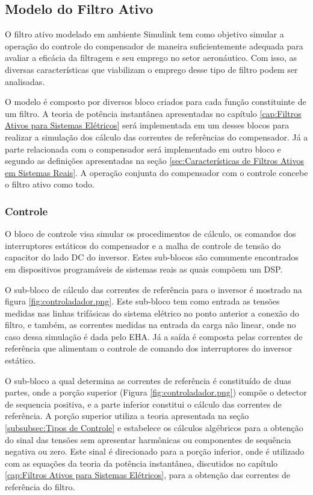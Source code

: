 
\subsection{Modelo do Filtro Ativo}

O filtro ativo modelado em ambiente Simulink tem como objetivo simular a operação do controle do compensador de maneira suficientemente adequada para avaliar a eficácia da filtragem e seu emprego no setor aeronáutico. Com isso, as diversas características que viabilizam o emprego desse tipo de filtro podem ser analisadas.

O modelo é composto por diversos bloco criados para cada função constituinte de um filtro. A teoria de potência instantânea apresentadas no capítulo \ref{cap:Filtros Ativos para Sistemas Elétricos} será implementada em um desses blocos para realizar a simulação dos cálculo das correntes de referências do compensador. Já a parte relacionada com o compensador será implementado em outro bloco e segundo as definições apresentadas na seção \ref{sec:Características de Filtros Ativos em Sistemas Reais}. A operação conjunta do compensador com o controle concebe o filtro ativo como todo.

\subsubsection{Controle}

O bloco de controle visa simular os procedimentos de cálculo, os comandos dos interruptores estáticos do compensador e a malha de controle de tensão do capacitor do lado DC do inversor. Estes sub-blocos são comumente encontrados em dispositivos programáveis de sistemas reais as quais compõem um DSP.

O sub-bloco de cálculo das correntes de referência para o inversor é mostrado na figura \ref{fig:controladador.png}. Este sub-bloco tem como entrada as tensões medidas nas linhas trifásicas do sistema elétrico no ponto anterior a conexão do filtro, e também, as correntes medidas na entrada da carga não linear, onde no caso dessa simulação é dada pelo EHA. Já a saída é composta pelas correntes de referência que alimentam o controle de comando dos interruptores do inversor estático.

O sub-bloco a qual determina as correntes de referência é constituído de duas partes, onde a porção superior (Figura \ref{fig:controladador.png}) compõe o detector de sequencia positiva, e a parte inferior constitui o cálculo das correntes de referência. A porção superior utiliza a teoria apresentada na seção \ref{subsubsec:Tipos de Controle} e estabelece os cálculos algébricos para a obtenção do sinal das tensões sem apresentar harmônicas ou componentes de sequência negativa ou zero. Este sinal é direcionado para a porção inferior, onde é utilizado com as equações da teoria da potência instantânea, discutidos no capítulo \ref{cap:Filtros Ativos para Sistemas Elétricos}, para a obtenção das correntes de referência do filtro.

